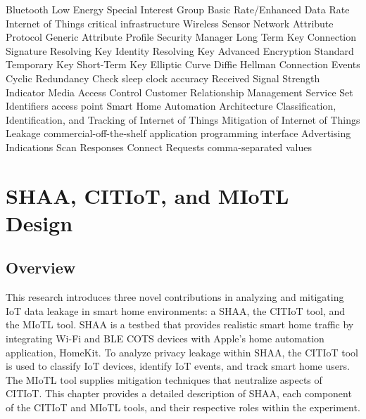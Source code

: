\documentclass[12pt,letterpaper,oneside]{book}
\begin{document}
	\begin{acronym}
		 {Bluetooth Low Energy}
		 {Special Interest Group}
		 {Basic Rate/Enhanced Data Rate}
		 {Internet of Things}
		 {critical infrastructure}
		 {Wireless Sensor Network}
		 {Attribute Protocol}
		 {Generic Attribute Profile}
		 {Security Manager}
		 {Long Term Key}
		 {Connection Signature Resolving Key}
		 {Identity Resolving Key}
		 {Advanced Encryption Standard}
		 {Temporary Key}
		 {Short-Term Key}
		 {Elliptic Curve Diffie Hellman}
		 {Connection Events}
		 {Cyclic Redundancy Check}
		 {sleep clock accuracy}
		 {Received Signal Strength Indicator}
		 {Media Access Control}
		 {Customer Relationship Management}
		 {Service Set Identifiers}
		 {access point}
		 {Smart Home Automation Architecture}
		 {Classification, Identification, and Tracking of Internet of Things}
		 {Mitigation of Internet of Things Leakage}
		 {commercial-off-the-shelf}
		 {application programming interface}
		 {Advertising Indications}
		 {Scan Responses}
		 {Connect Requests}
		 {comma-separated values}
	\end{acronym}
\mainmatter
	\chapter{SHAA, CITIoT, and MIoTL Design}
	
		\section{Overview}
		
		This research introduces three novel contributions in analyzing and mitigating \ac{IoT} data leakage in smart home environments: a \acf{SHAA}, the \acf{CITIoT} tool, and the \ac{MIoTL} tool. \ac{SHAA} is a testbed that provides realistic smart home traffic by integrating Wi-Fi and \ac{BLE} \ac{COTS} devices with Apple's home automation application, HomeKit. To analyze privacy leakage within \ac{SHAA}, the \ac{CITIoT} tool is used to classify \ac{IoT} devices, identify \ac{IoT} events, and track smart home users. The \ac{MIoTL} tool supplies mitigation techniques that neutralize aspects of \ac{CITIoT}. This chapter provides a detailed description of \ac{SHAA}, each component of the \ac{CITIoT} and \ac{MIoTL} tools, and their respective roles within the experiment. 
		
\end{document}

